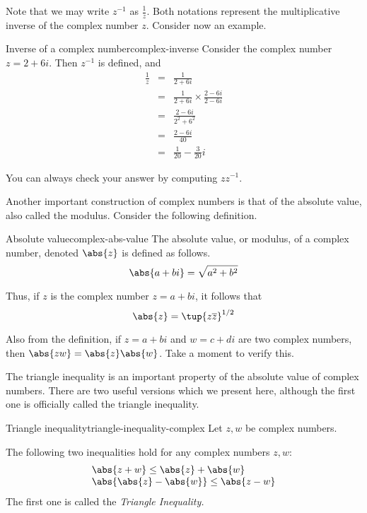 Note that we may write $z^{-1}$ as $\frac{1}{z}$. Both notations represent the multiplicative inverse of the complex number $z$. Consider now an example.

\begin{example}{Inverse of a complex number}{complex-inverse}
Consider the complex number $z = 2 + 6i$. Then $z^{-1}$ is defined, and
\begin{eqnarray*}
 \frac{1}{z} &=& \frac{1}{2+6i}\\
 &=& \frac{1}{2+6i}\times \frac{2-6i}{2-6i} \\
 &=& \frac{2-6i}{2^2+6^2} \\
 &=& \frac{2-6i}{40} \\
 &=& \frac{1}{20} -  \frac{3}{20}i
\end{eqnarray*}

You can always check your answer by computing $zz^{-1}$.
\end{example}

Another important construction of complex numbers is that of the absolute value, also called the modulus. Consider the following definition. 

\begin{definition}{Absolute value}{complex-abs-value}
%
The absolute
value, or modulus, of a complex number, denoted $\abs{z}$ is defined as follows.
\begin{equation*}
\abs{a+bi} =
\sqrt{a^{2}+b^{2}}
\end{equation*}
\end{definition}

Thus, if $z$ is the complex number $z=a+bi$, it follows that
\begin{equation*}
\abs{z} =\tup{z\overline{z}} ^{1/2}
\end{equation*}

Also from the definition, if $z=a+bi$ and $w=c+di$ are two complex numbers,
then $\abs{zw}=\abs{z}\abs{w}$. Take a moment to verify this.

The triangle inequality is an important property of the absolute value
of complex numbers. There are two useful versions which we present
here, although the first one is officially called the triangle inequality. 

\begin{proposition}{Triangle inequality}{triangle-inequality-complex}
Let $z,w$ be complex numbers. 

The following two inequalities hold for any  complex numbers $z,w$:
\begin{equation*}
\begin{array}{l}
\abs{z+w} \leq \abs{z} +\abs{w}  \\
\abs{\abs{z} -\abs{w}} \leq \abs{z-w} 
\end{array}
\end{equation*}
The first one is called the \em{Triangle Inequality}.
\end{proposition}

